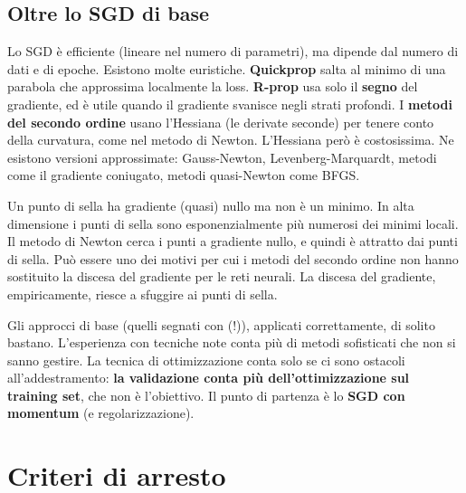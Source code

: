 \subsection{Oltre lo SGD di base}

Lo SGD è efficiente (lineare nel numero di parametri), ma dipende dal numero di dati e di epoche. Esistono molte
euristiche. \textbf{Quickprop} salta al minimo di una parabola che approssima localmente la loss.
\textbf{R-prop} usa solo il \textbf{segno} del gradiente, ed è utile quando il gradiente svanisce negli strati
profondi. I \textbf{metodi del secondo ordine} usano l'Hessiana (le derivate seconde) per tenere conto della
curvatura, come nel metodo di Newton. L'Hessiana però è costosissima. Ne esistono versioni approssimate:
Gauss-Newton, Levenberg-Marquardt, metodi  come il gradiente coniugato, metodi quasi-Newton
come BFGS.

\begin{attenzione}
Un punto di sella ha gradiente (quasi) nullo ma non è un minimo. In alta dimensione i punti di sella sono
esponenzialmente più numerosi dei minimi locali. Il metodo di Newton cerca i punti a gradiente nullo, e quindi è
attratto dai punti di sella. Può essere uno dei motivi per cui i metodi del secondo ordine non hanno sostituito
la discesa del gradiente per le reti neurali. La discesa del gradiente, empiricamente, riesce a sfuggire ai punti
di sella.
\end{attenzione}

Gli approcci di base (quelli segnati con (!)), applicati correttamente, di solito bastano. L'esperienza con
tecniche note conta più di metodi sofisticati che non si sanno gestire. La tecnica di ottimizzazione conta solo se
ci sono ostacoli all'addestramento: \textbf{la validazione conta più dell'ottimizzazione sul training set}, che non
è l'obiettivo. Il punto di partenza è lo \textbf{SGD con momentum} (e regolarizzazione).

\section{Criteri di arresto}
\label{sec:arresto}


